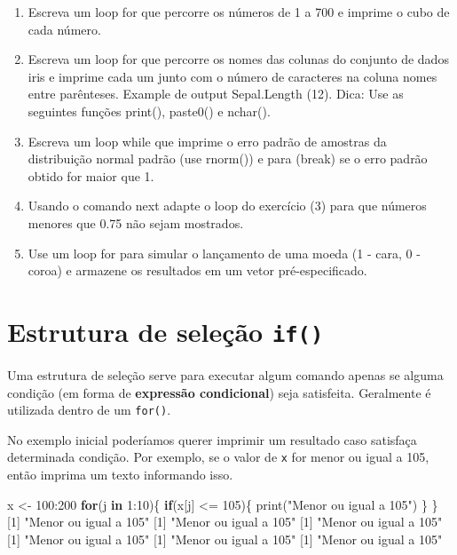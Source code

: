 \documentclass[
  10pt,
  a4paper]{book}
\newenvironment{Shaded}{\begin{snugshade}}{\end{snugshade}}
\newcommand{\ControlFlowTok}[1]{\textcolor[rgb]{0.13,0.29,0.53}{\textbf{#1}}}
\newcommand{\DecValTok}[1]{\textcolor[rgb]{0.00,0.00,0.81}{#1}}
\newcommand{\FunctionTok}[1]{\textcolor[rgb]{0.00,0.00,0.00}{#1}}
\newcommand{\NormalTok}[1]{#1}
\newcommand{\OtherTok}[1]{\textcolor[rgb]{0.56,0.35,0.01}{#1}}
\newcommand{\SpecialCharTok}[1]{\textcolor[rgb]{0.00,0.00,0.00}{#1}}
\newcommand{\StringTok}[1]{\textcolor[rgb]{0.31,0.60,0.02}{#1}}
\providecommand{\tightlist}{%
  \setlength{\itemsep}{0pt}\setlength{\parskip}{0pt}}
\begin{document}
\begin{enumerate}
\def\labelenumi{\arabic{enumi}.}
\tightlist
\item
  Escreva um loop for que percorre os números de 1 a 700 e imprime o cubo de cada número.
\item
  Escreva um loop for que percorre os nomes das colunas do conjunto de dados iris e imprime cada um junto com o número de caracteres na coluna nomes entre parênteses. Example de output Sepal.Length (12). Dica: Use as seguintes funções print(), paste0() e nchar().
\item
  Escreva um loop while que imprime o erro padrão de amostras da distribuição
  normal padrão (use rnorm()) e para (break) se o erro padrão obtido for maior que 1.
\item
  Usando o comando next adapte o loop do exercício (3) para que números menores que 0.75 não sejam mostrados.
\item
  Use um loop for para simular o lançamento de uma moeda (1 - cara, 0 - coroa) e armazene os resultados em um vetor pré-especificado.
\end{enumerate}

\hypertarget{estrutura-de-seleuxe7uxe3o-if}{%
\section{\texorpdfstring{Estrutura de seleção \texttt{if()}}{Estrutura de seleção if()}}\label{estrutura-de-seleuxe7uxe3o-if}}

Uma estrutura de seleção serve para executar algum comando apenas se
alguma condição (em forma de \textbf{expressão condicional}) seja satisfeita.
Geralmente é utilizada dentro de um \texttt{for()}.

No exemplo inicial poderíamos querer imprimir um resultado caso
satisfaça determinada condição. Por exemplo, se o valor de \texttt{x} for menor
ou igual a 105, então imprima um texto informando isso.

\begin{Shaded}
\begin{Highlighting}[]
\NormalTok{x }\OtherTok{\textless{}{-}} \DecValTok{100}\SpecialCharTok{:}\DecValTok{200}
\ControlFlowTok{for}\NormalTok{(j }\ControlFlowTok{in} \DecValTok{1}\SpecialCharTok{:}\DecValTok{10}\NormalTok{)\{}
    \ControlFlowTok{if}\NormalTok{(x[j] }\SpecialCharTok{\textless{}=} \DecValTok{105}\NormalTok{)\{}
        \FunctionTok{print}\NormalTok{(}\StringTok{"Menor ou igual a 105"}\NormalTok{)}
\NormalTok{    \}}
\NormalTok{\}}
\NormalTok{[}\DecValTok{1}\NormalTok{] }\StringTok{"Menor ou igual a 105"}
\NormalTok{[}\DecValTok{1}\NormalTok{] }\StringTok{"Menor ou igual a 105"}
\NormalTok{[}\DecValTok{1}\NormalTok{] }\StringTok{"Menor ou igual a 105"}
\NormalTok{[}\DecValTok{1}\NormalTok{] }\StringTok{"Menor ou igual a 105"}
\NormalTok{[}\DecValTok{1}\NormalTok{] }\StringTok{"Menor ou igual a 105"}
\NormalTok{[}\DecValTok{1}\NormalTok{] }\StringTok{"Menor ou igual a 105"}
\end{Highlighting}
\end{Shaded}
\end{document}
